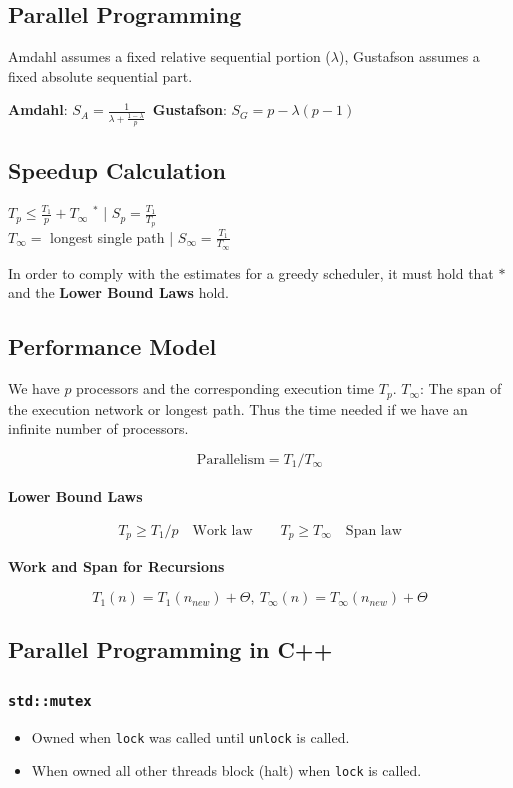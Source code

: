 \documentclass[9pt,landscape,a4paper, table]{extarticle}
\begin{document}
\begin{multicols*}{3}
\section{Parallel Programming}
Amdahl assumes a fixed relative sequential portion ($\lambda$), Gustafson assumes a fixed absolute sequential part.

\textbf{Amdahl}: $S_A = \frac{1}{\lambda + \frac{1-\lambda}{p}}$\ \textbf{Gustafson}: $S_G=p-\lambda(p-1)$

\subsection{Speedup Calculation}
$T_p \leq \frac{T_1}{p} + T_\infty $ $^*$ |  $S_p = \frac{T_1}{T_p}$\\
$T_{\infty} = $ longest single path | $S_{\infty} = \frac{T_1}{T_{\infty}}$

In order to comply with the estimates for a greedy scheduler, it must hold that $*$ and the \textbf{Lower Bound Laws} hold. 
\subsection{Performance Model}

We have $p$ processors and the corresponding execution time $T_p$.
$T_{\infty}$: The span of the execution network or longest path. Thus the time needed if we have an infinite number of processors. 

$$\text{Parallelism} = T_1/T_\infty$$\\

\textbf{Lower Bound Laws}

\begin{align*}
    T_p \geq T_1/p\quad \text{Work law}
    \qquad T_p \geq T_\infty\quad \text{Span law}
\end{align*}

\textbf{Work and Span for Recursions}

$$T_1(n) = T_1(n_{new}) + \Theta,\ T_\infty(n) = T_\infty(n_{new}) + \Theta$$

\subsection{Parallel Programming in C++}

\subsubsection{\texttt{std::mutex}}
\begin{itemize}
    \item Owned when \texttt{lock} was called until \texttt{unlock} is called. 
    \item When owned all other threads block (halt) when \texttt{lock} is called. 
\end{itemize}


\end{multicols*}
\end{document}
